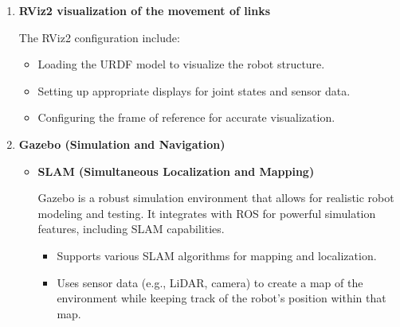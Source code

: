{\begin{enumerate}[label=\textbf{\arabic*}.]
		
	\begin{figure}[H]
		\centering
		\hfill
		\hfill
		\caption{Links and Joints \cite{links} \cite{joints}} 
		\label{fig:fig4}
	\end{figure}
	
	
	
	
		\item \textbf{RViz2 visualization of the movement of links} \par The RViz2 configuration include:
		\begin{itemize}
			\item Loading the URDF model to visualize the robot structure.
			\item Setting up appropriate displays for joint states and sensor data.
			\item Configuring the frame of reference for accurate visualization.
		\end{itemize}
		
		\item \textbf{Gazebo (Simulation and Navigation)}
		\begin{itemize}
			\item \textbf{SLAM (Simultaneous Localization and Mapping)} \par Gazebo is a robust simulation environment that allows for realistic robot modeling and testing. It integrates with ROS for powerful simulation features, including SLAM capabilities.
			\begin{itemize}
				\item Supports various SLAM algorithms for mapping and localization.
				\item Uses sensor data (e.g., LiDAR, camera) to create a map of the environment while
				keeping track of the robot's position within that map.
			\end{itemize}
			

\end{itemize}
\end{enumerate}}
